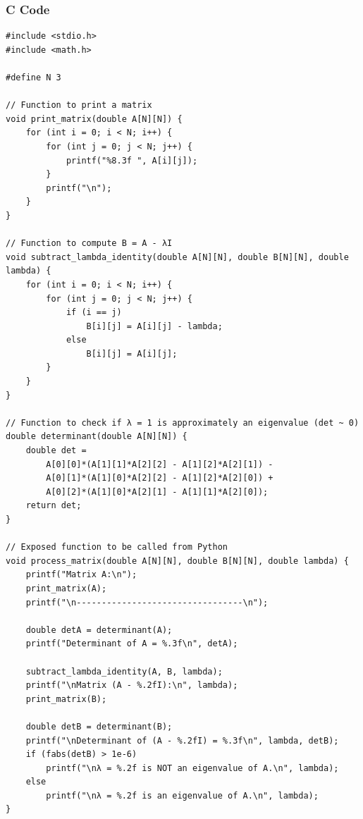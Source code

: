 \documentclass{beamer}
\begin{document}
\begin{frame}[fragile]
    \frametitle{C Code}
    \begin{lstlisting}
#include <stdio.h>
#include <math.h>

#define N 3

// Function to print a matrix
void print_matrix(double A[N][N]) {
    for (int i = 0; i < N; i++) {
        for (int j = 0; j < N; j++) {
            printf("%8.3f ", A[i][j]);
        }
        printf("\n");
    }
}

// Function to compute B = A - λI
void subtract_lambda_identity(double A[N][N], double B[N][N], double lambda) {
    for (int i = 0; i < N; i++) {
        for (int j = 0; j < N; j++) {
            if (i == j)
                B[i][j] = A[i][j] - lambda;
            else
                B[i][j] = A[i][j];
        }
    }
}

// Function to check if λ = 1 is approximately an eigenvalue (det ~ 0)
double determinant(double A[N][N]) {
    double det =
        A[0][0]*(A[1][1]*A[2][2] - A[1][2]*A[2][1]) -
        A[0][1]*(A[1][0]*A[2][2] - A[1][2]*A[2][0]) +
        A[0][2]*(A[1][0]*A[2][1] - A[1][1]*A[2][0]);
    return det;
}

// Exposed function to be called from Python
void process_matrix(double A[N][N], double B[N][N], double lambda) {
    printf("Matrix A:\n");
    print_matrix(A);
    printf("\n---------------------------------\n");

    double detA = determinant(A);
    printf("Determinant of A = %.3f\n", detA);

    subtract_lambda_identity(A, B, lambda);
    printf("\nMatrix (A - %.2fI):\n", lambda);
    print_matrix(B);

    double detB = determinant(B);
    printf("\nDeterminant of (A - %.2fI) = %.3f\n", lambda, detB);
    if (fabs(detB) > 1e-6)
        printf("\nλ = %.2f is NOT an eigenvalue of A.\n", lambda);
    else
        printf("\nλ = %.2f is an eigenvalue of A.\n", lambda);
}


    \end{lstlisting}
\end{frame}
\end{document}
